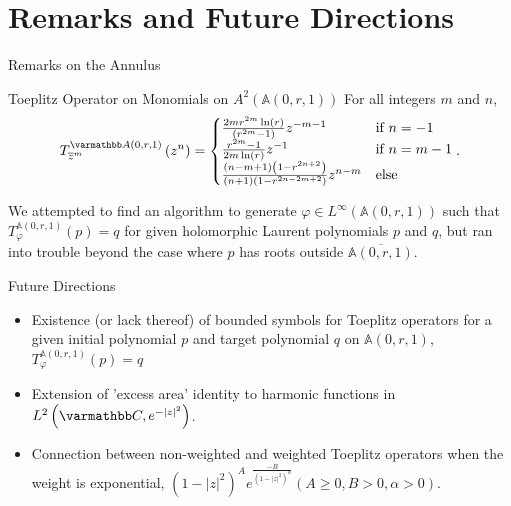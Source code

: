 \documentclass{reu_beamer}
\begin{document}
\section{Remarks and Future Directions}
\begin{frame}{Remarks on the Annulus}
    \begin{block}{Toeplitz Operator on Monomials on $A^{2}(\mathbb{A}(0,r,1))$}
        For all integers \(m\) and \(n\),
        \[
            T^{\mathbb{A}\left(0,r,1\right)}_{\ol{z}^m}\left(z^n\right) = 
            \begin{cases}
                \frac{2 m r^{2 m} \ln(r)}{\prn{r^{2 m} - 1}}z^{-m - 1} &\text{if}\ n = -1 \\
                \frac{r^{2 m} - 1}{2 m \ln(r)} z^{-1} &\text{if}\ n = m - 1 \\
                \frac{(n - m + 1)\prn{1 - r^{2 n+2}}}{(n+1)\prn{1 - r^{2 n - 2  m +2}}} z^{n-m} &\text{else}
            \end{cases}.
        \]
    \end{block}
    We attempted to find an algorithm to generate $\varphi\in L^{\infty}\left(\mathbb{A}\left(0,r,1\right)\right)$ such that $T^{\mathbb{A}(0,r,1)}_{\varphi}(p) = q$ for given holomorphic Laurent polynomials $p$ and $q$, but ran into trouble beyond the case where $p$ has roots outside $\overline{\mathbb{A}(0,r,1)}$.
\end{frame}
\begin{frame}{Future Directions}
    \begin{itemize}
        \item Existence (or lack thereof) of bounded symbols for Toeplitz operators for a given initial polynomial $p$ and target polynomial $q$ on $\mathbb{A}(0,r,1)$, $T^{\mathbb{A}(0,r,1)}_{\varphi}(p) = q$
        \newline
        \item Extension of 'excess area' identity to harmonic functions in \(L^2\prn{\C, e^{-|z|^2}}\).
        \newline
        \item Connection between non-weighted and weighted Toeplitz operators when the weight is exponential, $(1-|z|^2)^{A}
        e^{\frac{-B}{(1-|z|^2)^{\alpha}}}(A\geq 0,B>0,\alpha>0)$.%
    \end{itemize}
\end{frame}
\end{document}
